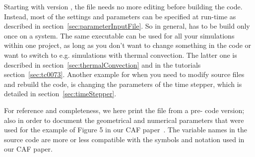 \documentclass[a4paper, 11pt, DIV=11]{scrartcl}
\begin{document}
Starting with \nsc version , the file  needs
no more editing before building the code. Instead, most of the settings and
parameters can be specified at run-time as described in section~\ref{sec:parameterInputFile}.
So in general, \nsc has to be build only once on a system. The same executable
can be used for all your simulations within one project, as long as you don't
want to change something in the code or want to switch to e.g. simulations with
thermal convection. The latter one is described in section~\ref{sec:thermalConvection}
and in the tutorials section~\ref{sec:tc0073}. Another example for when you need to
modify source files and rebuild the code, is changing the parameters of the time
stepper, which is detailed in section~\ref{sec:timeStepper}.
\par
For reference and completeness, we here print the  file
from a pre- code version; also in order to document the geometrical
and numerical parameters that were used for the example of Figure 5 in our CAF
paper~\cite{Shi2015}. The variable names in the source code are more or less
compatible with the symbols and notation used in our CAF paper.
\end{document}
